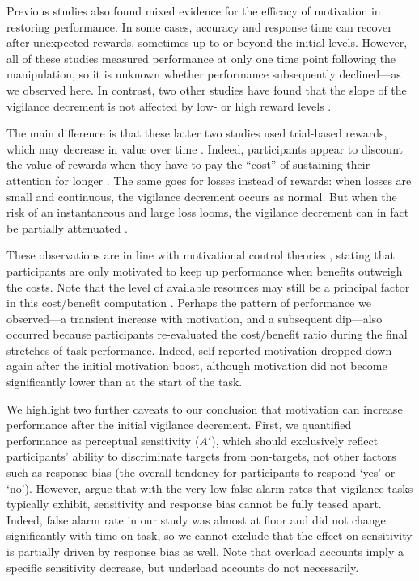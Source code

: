 \documentclass[11pt,]{memoir}
\begin{document}
Previous studies also found mixed evidence for the efficacy of motivation in restoring performance. In some cases, accuracy \autocite{Hopstaken2015} and response time \autocites{Boksem2006}{Lorist2009} can recover after unexpected rewards, sometimes up to or beyond the initial levels. However, all of these studies measured performance at only one time point following the manipulation, so it is unknown whether performance subsequently declined---as we observed here. In contrast, two other studies have found that the slope of the vigilance decrement is not affected by low- or high reward levels \autocites{Esterman2014}{Gergelyfi2015}.

The main difference is that these latter two studies used trial-based rewards, which may decrease in value over time \autocite{Fortenbaugh2017}. Indeed, participants appear to discount the value of rewards when they have to pay the ``cost'' of sustaining their attention for longer \autocite{Massar2016}. The same goes for losses instead of rewards: when losses are small and continuous, the vigilance decrement occurs as normal. But when the risk of an instantaneous and large loss looms, the vigilance decrement can in fact be partially attenuated \autocite{Esterman2016}.

These observations are in line with motivational control theories \autocites{Hockey1997}{Kurzban2013}, stating that participants are only motivated to keep up performance when benefits outweigh the costs. Note that the level of available resources may still be a principal factor in this cost/benefit computation \autocites{Boksem2008}{Christie2015}. Perhaps the pattern of performance we observed---a transient increase with motivation, and a subsequent dip---also occurred because participants re-evaluated the cost/benefit ratio during the final stretches of task performance. Indeed, self-reported motivation dropped down again after the initial motivation boost, although motivation did not become significantly lower than at the start of the task.

We highlight two further caveats to our conclusion that motivation can increase performance after the initial vigilance decrement. First, we quantified performance as perceptual sensitivity (\(A'\)), which should exclusively reflect participants' ability to discriminate targets from non-targets, not other factors such as response bias (the overall tendency for participants to respond `yes' or `no'). However, \textcite{Thomson2016} argue that with the very low false alarm rates that vigilance tasks typically exhibit, sensitivity and response bias cannot be fully teased apart. Indeed, false alarm rate in our study was almost at floor and did not change significantly with time-on-task, so we cannot exclude that the effect on sensitivity is partially driven by response bias as well. Note that overload accounts imply a specific sensitivity decrease, but underload accounts do not necessarily.
\end{document}
